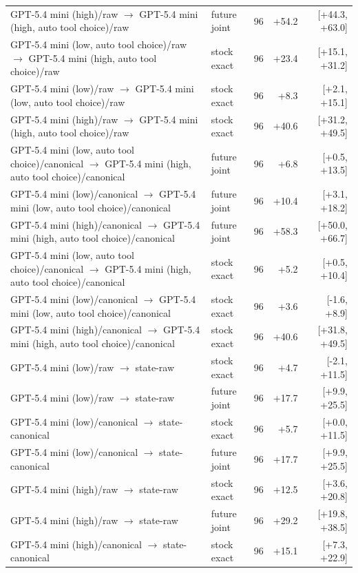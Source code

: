 \begin{table}[htbp]
{\begin{tabular}{lllrr}
GPT-5.4 mini (high)/raw $\to$ GPT-5.4 mini (high, auto tool choice)/raw & future joint & 96 & +54.2 & [+44.3, +63.0] \\
GPT-5.4 mini (low, auto tool choice)/raw $\to$ GPT-5.4 mini (high, auto tool choice)/raw & stock exact & 96 & +23.4 & [+15.1, +31.2] \\
GPT-5.4 mini (low)/raw $\to$ GPT-5.4 mini (low, auto tool choice)/raw & stock exact & 96 & +8.3 & [+2.1, +15.1] \\
GPT-5.4 mini (high)/raw $\to$ GPT-5.4 mini (high, auto tool choice)/raw & stock exact & 96 & +40.6 & [+31.2, +49.5] \\
GPT-5.4 mini (low, auto tool choice)/canonical $\to$ GPT-5.4 mini (high, auto tool choice)/canonical & future joint & 96 & +6.8 & [+0.5, +13.5] \\
GPT-5.4 mini (low)/canonical $\to$ GPT-5.4 mini (low, auto tool choice)/canonical & future joint & 96 & +10.4 & [+3.1, +18.2] \\
GPT-5.4 mini (high)/canonical $\to$ GPT-5.4 mini (high, auto tool choice)/canonical & future joint & 96 & +58.3 & [+50.0, +66.7] \\
GPT-5.4 mini (low, auto tool choice)/canonical $\to$ GPT-5.4 mini (high, auto tool choice)/canonical & stock exact & 96 & +5.2 & [+0.5, +10.4] \\
GPT-5.4 mini (low)/canonical $\to$ GPT-5.4 mini (low, auto tool choice)/canonical & stock exact & 96 & +3.6 & [-1.6, +8.9] \\
GPT-5.4 mini (high)/canonical $\to$ GPT-5.4 mini (high, auto tool choice)/canonical & stock exact & 96 & +40.6 & [+31.8, +49.5] \\
GPT-5.4 mini (low)/raw $\to$ state-raw & stock exact & 96 & +4.7 & [-2.1, +11.5] \\
GPT-5.4 mini (low)/raw $\to$ state-raw & future joint & 96 & +17.7 & [+9.9, +25.5] \\
GPT-5.4 mini (low)/canonical $\to$ state-canonical & stock exact & 96 & +5.7 & [+0.0, +11.5] \\
GPT-5.4 mini (low)/canonical $\to$ state-canonical & future joint & 96 & +17.7 & [+9.9, +25.5] \\
GPT-5.4 mini (high)/raw $\to$ state-raw & stock exact & 96 & +12.5 & [+3.6, +20.8] \\
GPT-5.4 mini (high)/raw $\to$ state-raw & future joint & 96 & +29.2 & [+19.8, +38.5] \\
GPT-5.4 mini (high)/canonical $\to$ state-canonical & stock exact & 96 & +15.1 & [+7.3, +22.9] \\

\end{tabular}}
\end{table}
